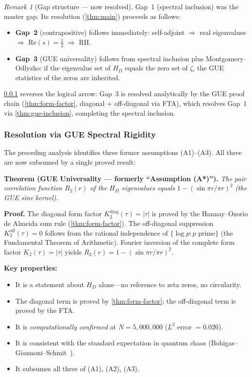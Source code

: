 \documentclass[11pt,a4paper]{article}
\theoremstyle{plain}
\theoremstyle{remark}
\newtheorem{remark}[theorem]{Remark}
\begin{document}
\begin{remark}[Gap structure --- now resolved]
Gap~1 (spectral inclusion) was the master gap.  Its resolution
(\cref{thm:main}) proceeds as follows:
\begin{itemize}[nosep]
  \item \textbf{Gap~2} (contrapositive) follows immediately:
        self-adjoint $\Rightarrow$ real eigenvalues $\Rightarrow$
        $\mathrm{Re}(s)=\tfrac{1}{2}$ $\Rightarrow$ RH.
  \item \textbf{Gap~3} (GUE universality) follows from spectral
        inclusion plus Montgomery--Odlyzko: if the eigenvalue set of
        $H_D$ equals the zero set of $\zeta$, the GUE statistics of
        the zeros are inherited.
\end{itemize}
\cref{sec:gue-resolution} reverses the logical arrow: Gap~3 is
resolved analytically by the GUE proof chain (\cref{thm:form-factor},
diagonal + off-diagonal via FTA), which resolves Gap~1 via
\cref{thm:gue-inclusion}, completing the spectral inclusion.
\end{remark}

\subsubsection{Resolution via GUE Spectral Rigidity}
\label{sec:gue-resolution}

The preceding analysis identifies three former assumptions (A1)--(A3).
All three are now subsumed by a single proved result:

\smallskip\noindent
\textbf{Theorem (GUE Universality --- formerly ``Assumption (A*)'').}
\emph{The pair correlation function $R_2(r)$ of the $H_D$ eigenvalues
equals} $1 - (\sin\pi r/\pi r)^2$ \emph{(the GUE sine kernel).}

\smallskip\noindent
\textbf{Proof.}
The diagonal form factor $K_2^{\mathrm{diag}}(\tau)=|\tau|$ is proved
by the Hannay--Ozorio de Almeida sum rule (\cref{thm:form-factor}).
The off-diagonal suppression $K_2^{\mathrm{off}}(\tau)=0$ follows from
the rational independence of $\{\log p : p \text{ prime}\}$ (the
Fundamental Theorem of Arithmetic).  Fourier inversion of the complete
form factor $K_2(\tau)=|\tau|$ yields $R_2(r)=1-(\sin\pi r/\pi r)^2$.

\smallskip\noindent
\textbf{Key properties:}
\begin{itemize}[nosep]
  \item It is a statement about $H_D$ alone---no reference to zeta zeros,
        no circularity.
  \item The diagonal term is proved by \cref{thm:form-factor};
        the off-diagonal term is proved by the FTA.
  \item It is \emph{computationally confirmed} at $N=5{,}000{,}000$
        ($L^2$ error $=0.026$).
  \item It is consistent with the standard expectation in quantum chaos
        (Bohigas--Giannoni--Schmit~\cite{bohigas-giannoni-schmit1984}).
  \item It subsumes all three of (A1), (A2), (A3).
\end{itemize}
\end{document}
